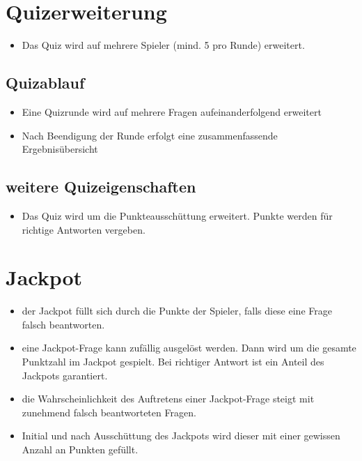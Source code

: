 \documentclass[11pt,a4paper]{scrreprt}
\begin{document}
\section{Quizerweiterung}
\begin{itemize}
\item Das Quiz wird auf mehrere Spieler (mind. 5 pro Runde) erweitert.
\end{itemize}
\subsection{Quizablauf}
\begin{itemize}
\item Eine Quizrunde wird auf mehrere Fragen aufeinanderfolgend erweitert
\item Nach Beendigung der Runde erfolgt eine zusammenfassende Ergebnisübersicht
\end{itemize}
\subsection{weitere Quizeigenschaften}
\begin{itemize}
\item Das Quiz wird um die Punkteausschüttung erweitert. Punkte werden für richtige Antworten vergeben.
\end{itemize}

\section{Jackpot}
\begin{itemize}
\item der Jackpot füllt sich durch die Punkte der Spieler, falls diese eine Frage falsch beantworten.
\item eine Jackpot-Frage kann zufällig ausgelöst werden. Dann wird um die gesamte Punktzahl im Jackpot gespielt. Bei richtiger Antwort ist ein Anteil des Jackpots garantiert.
\item die Wahrscheinlichkeit des Auftretens einer Jackpot-Frage steigt mit zunehmend falsch beantworteten Fragen.
\item Initial und nach Ausschüttung des Jackpots wird dieser mit einer gewissen Anzahl an Punkten gefüllt.
\end{itemize}
\end{document}
